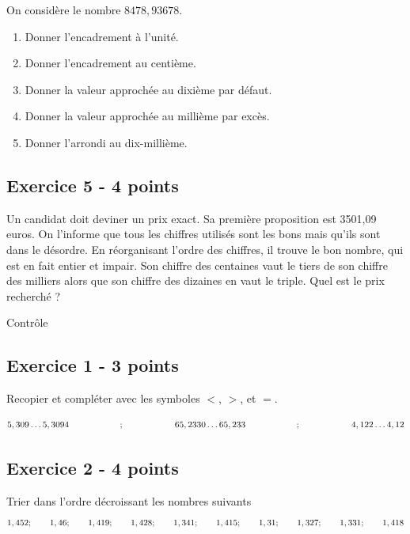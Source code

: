\documentclass[12 pt]{extarticle}
\theoremstyle{plain}
\begin{document}
 On considère le nombre $8 478, 936 78$. \begin{enumerate}
 \item Donner l'encadrement à l'unité. 
 \item Donner l'encadrement au centième. 
 \item Donner la valeur approchée au dixième par défaut. 
 \item Donner la valeur approchée au millième par excès. 
 \item Donner l'arrondi au dix-millième. 
 \end{enumerate}
 
 \subsection*{Exercice 5 - 4 points}
 
 Un candidat doit deviner un prix exact. 
Sa première proposition est 3501,09 euros.
On l'informe que tous les chiffres utilisés sont les bons mais qu'ils sont dans le désordre. En réorganisant l'ordre des chiffres, il trouve le bon nombre,
qui est en fait entier et impair.
Son chiffre des centaines vaut le tiers de son chiffre des milliers alors que son chiffre des dizaines en vaut le triple. Quel est le prix recherché ?
 
 \newpage
 

\begin{center}{\Large Contrôle}\\ 
 \end{center}
 
  \subsection*{Exercice 1 - 3 points} 
 
 Recopier et compléter avec les symboles $<$, $>$, et $=$. 
 
 \[ 5,309 \ldots 5, 3094 \hspace{2 cm}; \hspace{2 cm}
 65, 2330 \ldots 65, 233 \hspace{2 cm}; \hspace{2 cm}
 4,122 \ldots 4, 12\]
 
  \subsection*{Exercice 2 - 4 points}
 Trier dans l'ordre décroissant les nombres suivants 
 \[ 
 1,452 ; \hspace{.7 cm}
1,46 ; \hspace{.7 cm}
1,419 ; \hspace{.7 cm}
1,428 ; \hspace{.7 cm}
 1,341   ; \hspace{.7 cm}
 1,415 ; \hspace{.7 cm}
1,31 ; \hspace{.7 cm}
1,327 ; \hspace{.7 cm}
1,331 ; \hspace{.7 cm}
1,418
 \]
\end{document}
